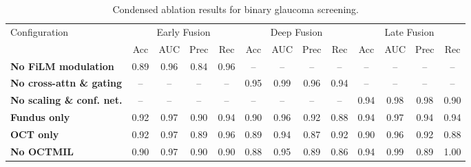 \documentclass[preprint,12pt]{elsarticle}
\begin{document}
\begin{table}[!t]
    \centering
    \caption{Condensed ablation results for binary glaucoma screening.}
    \label{tab:binary-ablation-condensed}
    \scriptsize
    \setlength{\tabcolsep}{3pt}
    \begin{tabular}{|l|cccc|cccc|cccc|}
        \hline
        \multirow{2}{*}{Configuration}     &
        \multicolumn{4}{c|}{Early Fusion}  &
        \multicolumn{4}{c|}{Deep Fusion}   &
        \multicolumn{4}{c|}{Late Fusion}                                \\
        \cline{2-13}
                                           & Acc  & AUC  & Prec & Rec &
        Acc                                & AUC  & Prec & Rec  &
        Acc                                & AUC  & Prec & Rec          \\
        \hline
        \textbf{No FiLM modulation}        &
        0.89                               & 0.96 & 0.84 & 0.96 &
        --                                 & --   & --   & --   &
        --                                 & --   & --   & --           \\
        \textbf{No cross-attn \& gating}   &
        --                                 & --   & --   & --   &
        0.95                               & 0.99 & 0.96 & 0.94 &
        --                                 & --   & --   & --           \\
        \textbf{No scaling \& conf. net.}  &
        --                                 & --   & --   & --   &
        --                                 & --   & --   & --   &
        0.94                               & 0.98 & 0.98 & 0.90         \\
        \hline
        \textbf{Fundus only}               &
        0.92                               & 0.97 & 0.90 & 0.94 &
        0.90                               & 0.96 & 0.92 & 0.88 &
        0.94                               & 0.97 & 0.94 & 0.94         \\
        \textbf{OCT only}                  &
        0.92                               & 0.97 & 0.89 & 0.96 &
        0.89                               & 0.94 & 0.87 & 0.92 &
        0.90                               & 0.96 & 0.92 & 0.88         \\
        \hline
        \textbf{No OCTMIL}                 &
        0.90                               & 0.97 & 0.90 & 0.90 &
        0.88                               & 0.95 & 0.89 & 0.86 &
        0.94                               & 0.99 & 0.89 & 1.00         \\

\end{tabular}
\end{table}
\end{document}
